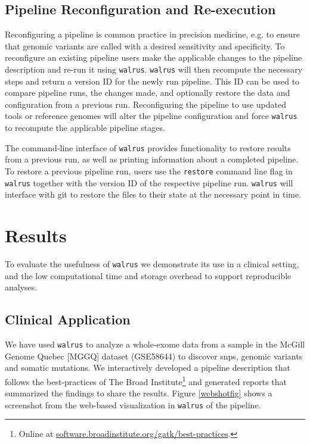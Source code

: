 \subsection{Pipeline Reconfiguration and Re-execution}
Reconfiguring a pipeline is common practice in precision medicine, e.g. to
ensure that genomic variants are called with a desired sensitivity and
specificity.  To reconfigure an existing pipeline users make the applicable
changes to the pipeline description and re-run it using \texttt{walrus}.
\texttt{walrus} will then recompute the necessary steps and return a version ID
for the newly run pipeline. This ID can be used to compare pipeline runs, the
changes made, and optionally restore the data and configuration from a
previous run.  Reconfiguring the pipeline to use updated tools or reference
genomes will alter the pipeline configuration and force \texttt{walrus} to
recompute the applicable pipeline stages. 

The command-line interface of \texttt{walrus} provides functionality to restore
results from a previous run, as well as printing information about a completed
pipeline.  To restore a previous pipeline run, users use the \texttt{restore}
command line flag in \texttt{walrus} together with the version ID of the
respective pipeline run. \texttt{walrus} will interface with git to restore the
files to their state at the necessary point in time.

\section{Results}
To evaluate the usefulness of \texttt{walrus} we demonstrate its use in a
clinical setting, and the low computational time and storage overhead to support
reproducible analyses.

\subsection{Clinical Application} 
We have used \texttt{walrus} to analyze a whole-exome data from a sample
in the McGill Genome Quebec [MGGQ] dataset (GSE58644)\cite{tofigh2014prognostic}
to discover \glspl{snp}, genomic variants and somatic mutations. We
interactively developed a pipeline description that follows the best-practices
of The Broad Institute\footnote{Online at
\url{software.broadinstitute.org/gatk/best-practices}.} and generated reports
that summarized the findings to share the results. Figure \ref{webshotfig} shows
a screenshot from the web-based visualization in \texttt{walrus} of the
pipeline. 

